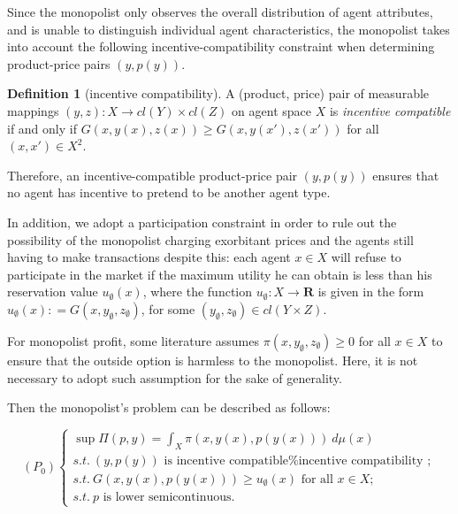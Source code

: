 \documentclass[a4paper, 11pt]{amsart}
\numberwithin{equation}{section}
\theoremstyle{plain}
\theoremstyle{definition}
\newtheorem{definition}[theorem]{Definition}
\theoremstyle{remark}
\newcommand{\R}{\mathbf{R}}
\begin{document}

{%
Since the monopolist only observes the overall distribution of agent attributes, and is unable to distinguish individual agent characteristics, the monopolist takes into account the following incentive-compatibility constraint when determining product-price pairs $(y, p(y))$.
	}

\begin{definition}[incentive compatibility]
	A (product, price) pair of measurable mappings $(y,z): X \longrightarrow cl(Y) \times cl(Z)$ on agent space $X$ is \textit{incentive compatible} if and only if $G(x,y(x),z(x)) \ge G(x, y(x'), z(x'))$ for all $(x,x')\in X^2$.
\end{definition}

Therefore, an incentive-compatible product-price pair $(y, p(y))$ ensures that no agent has incentive to pretend to be another agent type.\medskip 


In addition, we adopt a participation constraint in order to rule out the possibility of the monopolist charging exorbitant prices and the agents still having to make transactions despite this: each agent $x\in X$ will refuse to participate in the market if the maximum utility he can obtain %
is less than %
his reservation value $u_{\emptyset}(x)$, where the function $u_{\emptyset}: X \longrightarrow \R$ is given in the form $u_{\emptyset}(x): = G(x, y_{\emptyset}, z_{\emptyset})$, for some $(y_{\emptyset}, z_{\emptyset}) \in cl(Y \times Z)$. \medskip

{For monopolist profit, some literature assumes $\pi(x, y_{\emptyset}, z_{\emptyset}) \ge  0$ for all $x\in X$ to ensure that the outside option is harmless to the monopolist. Here, it is not necessary to adopt such assumption for the sake of generality. \medskip}

Then the monopolist's problem can be described as follows:


\begin{equation}\label{origin_problem}
(P_0)
\begin{cases}
\sup \Pi(p,y)=\int_{X} \pi(x, y(x), p(y(x)))~ d\mu(x)\\
s.t.\ (y,p(y)) \text{~is incentive compatible%
	};\\
s.t.\  G(x, y(x), p(y(x))) \ge u_{\emptyset}(x) \text{ for all } x \in X;\\
s.t.\ p \text{  is lower semicontinuous}.
\end{cases}
\end{equation}
\end{document}

